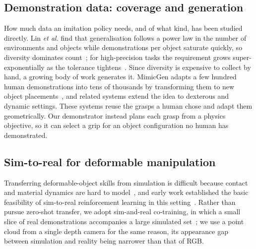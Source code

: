\subsection{Demonstration data: coverage and generation}
How much data an imitation policy needs, and of what kind, has been studied directly. Lin
\emph{et al.} find that generalisation follows a power law in the number of environments and
objects while demonstrations per object saturate quickly, so diversity dominates
count~\cite{lin2025datascaling}; for high-precision tasks the requirement grows
super-exponentially as the tolerance tightens~\cite{curseofprecision}. Since diversity is
expensive to collect by hand, a growing body of work generates it. MimicGen adapts a few
hundred human demonstrations into tens of thousands by transforming them to new object
placements~\cite{mandlekar2023mimicgen}, and related systems extend the idea to dexterous and
dynamic settings. These systems reuse the grasps a human chose and adapt them geometrically.
Our demonstrator instead plans each grasp from a physics objective, so it can select a grip
for an object configuration no human has demonstrated.

\subsection{Sim-to-real for deformable manipulation}
Transferring deformable-object skills from simulation is difficult because contact and
material dynamics are hard to model~\cite{yin2021modeling,arriola2020modeling}, and early work
established the basic feasibility of sim-to-real reinforcement learning in this
setting~\cite{blanco2024t}. Rather than pursue zero-shot transfer, we adopt sim-and-real
co-training, in which a small slice of real demonstrations accompanies a large simulated
set~\cite{simrealcotrain}; we use a point cloud from a single depth camera for the same
reason, its appearance gap between simulation and reality being narrower than that of RGB.
